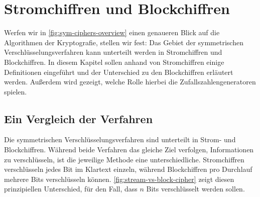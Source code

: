 \chapter{Stromchiffren und Blockchiffren} \label{cha:stromchiffren}



\noindent
Werfen wir in \autoref{fig:sym-ciphers-overview} einen genaueren Blick auf die Algorithmen
der Kryptografie, stellen wir fest: Das Gebiet
der symmetrischen Verschlüsselungsverfahren kann unterteilt werden in Stromchiffren
und Blockchiffren.
In diesem Kapitel sollen anhand von Stromchiffren einige Definitionen eingeführt
und der Unterschied zu den Blockchiffren erläutert werden.
Außerdem wird gezeigt, welche Rolle hierbei die Zufallszahlengeneratoren spielen.

\section{Ein Vergleich der Verfahren}
Die symmetrischen Verschlüsselungsverfahren sind unterteilt in Strom- und Blockchiffren.
Während beide Verfahren das gleiche Ziel verfolgen, Informationen zu verschlüsseln,
ist die jeweilige
Methode eine unterschiedliche. Stromchiffren verschlüsseln jedes Bit im Klartext einzeln,
während Blockchiffren pro Durchlauf mehrere Bits verschlüsseln können.
\autoref{fig:stream-vs-block-cipher} zeigt diesen prinzipiellen Unterschied, für den Fall, dass
$n$ Bits verschlüsselt werden sollen.



